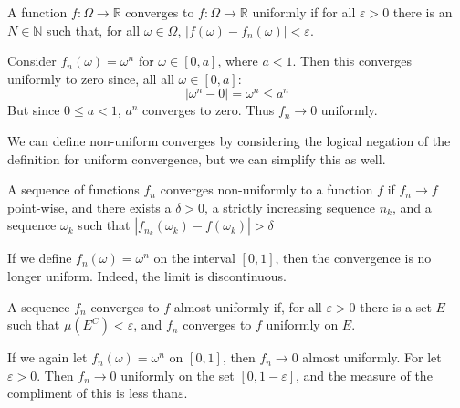         \begin{definition}
            A function $f:\Omega\rightarrow\mathbb{R}$
            converges to $f:\Omega\rightarrow\mathbb{R}$
            uniformly if for all $\varepsilon>0$ there is
            an $N\in\mathbb{N}$ such that, for all
            $\omega\in\Omega$,
            $|f(\omega)-f_{n}(\omega)|<\varepsilon$.
        \end{definition}
        \begin{example}
            Consider $f_{n}(\omega)=\omega^{n}$ for
            $\omega\in[0,a]$, where $a<1$. Then this
            converges uniformly to zero since, all all
            $\omega\in[0,a]$:
            \begin{equation}
                |\omega^{n}-0|=\omega^{n}\leq{a}^{n}
            \end{equation}
            But since $0\leq{a}<1$, $a^{n}$ converges to
            zero. Thus $f_{n}\rightarrow{0}$ uniformly.
        \end{example}
        We can define non-uniform converges by considering
        the logical negation of the definition for
        uniform convergence, but we can simplify this as
        well.
        \begin{theorem}
            A sequence of functions $f_{n}$ converges
            non-uniformly to a function $f$ if
            $f_{n}\rightarrow{f}$ point-wise, and there
            exists a $\delta>0$, a strictly increasing
            sequence $n_{k}$, and a sequence $\omega_{k}$
            such that
            $|f_{n_{k}}(\omega_{k})-f(\omega_{k})|>\delta$
        \end{theorem}
        \begin{example}
            If we define $f_{n}(\omega)=\omega^{n}$ on the
            interval $[0,1]$, then the convergence is no
            longer uniform. Indeed, the limit is
            discontinuous.
        \end{example}
        \begin{definition}
            A sequence $f_{n}$ converges to $f$ almost
            uniformly if, for all $\varepsilon>0$ there is
            a set $E$ such that $\mu(E^{C})<\varepsilon$,
            and $f_{n}$ converges to $f$ uniformly on
            $E$.
        \end{definition}
        \begin{example}
            If we again let $f_{n}(\omega)=\omega^{n}$ on
            $[0,1]$, then $f_{n}\rightarrow{0}$
            almost uniformly. For let $\varepsilon>0$. Then
            $f_{n}\rightarrow{0}$ uniformly on the set
            $[0,1-\varepsilon]$, and the measure of the
            compliment of this is less than$ \varepsilon$.
        \end{example}
